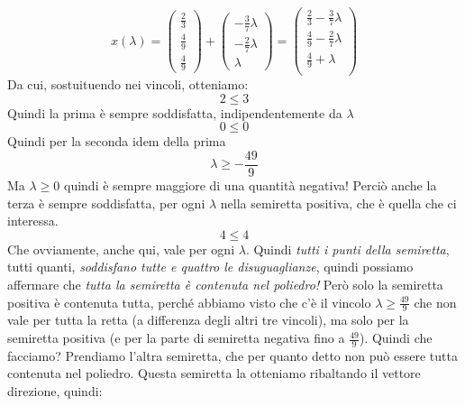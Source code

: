 \begin{equation*}
    x(\lambda) = \begin{pmatrix}
        \frac{2}{3}\\
        \frac{4}{9}\\
        \frac{4}{9}
    \end{pmatrix} + \begin{pmatrix}
        -\frac{3}{7}\lambda\\
        -\frac{2}{7}\lambda\\
        \lambda 
    \end{pmatrix} = \begin{pmatrix}
        \frac{2}{3}-\frac{3}{7}\lambda\\
        \frac{4}{9}-\frac{2}{7}\lambda\\
        \frac{4}{9}+\lambda\\
    \end{pmatrix}
\end{equation*}
Da cui, sostuituendo nei vincoli, otteniamo:
\begin{equation*}
    2 \leq 3
\end{equation*}
Quindi la prima è sempre soddisfatta, indipendentemente da $\lambda$
\begin{equation*}
    0 \leq 0
\end{equation*}
Quindi per la seconda idem della prima
\begin{equation*}
    \lambda \geq -\frac{49}{9}
\end{equation*}
Ma $\lambda \geq 0$ quindi è sempre maggiore di una quantità negativa! Perciò anche la terza è sempre soddisfatta, per ogni $\lambda$ nella semiretta positiva, che è quella che ci interessa.
\begin{equation*}
    4 \leq 4
\end{equation*}
Che ovviamente, anche qui, vale per ogni $\lambda$. Quindi \textit{tutti i punti della semiretta}, tutti quanti, \textit{soddisfano tutte e quattro le disuguaglianze}, quindi possiamo affermare che \textit{tutta la semiretta è contenuta nel poliedro!} Però solo la semiretta positiva è contenuta tutta, perché abbiamo visto che c'è il vincolo $\lambda \geq \frac{49}{9}$ che non vale per tutta la retta (a differenza degli altri tre vincoli), ma solo per la semiretta positiva (e per la parte di semiretta negativa fino a $\frac{49}{9}$). Quindi che facciamo? Prendiamo l'altra semiretta, che per quanto detto non può essere tutta contenuta nel poliedro. Questa semiretta la otteniamo ribaltando il vettore direzione, quindi:
